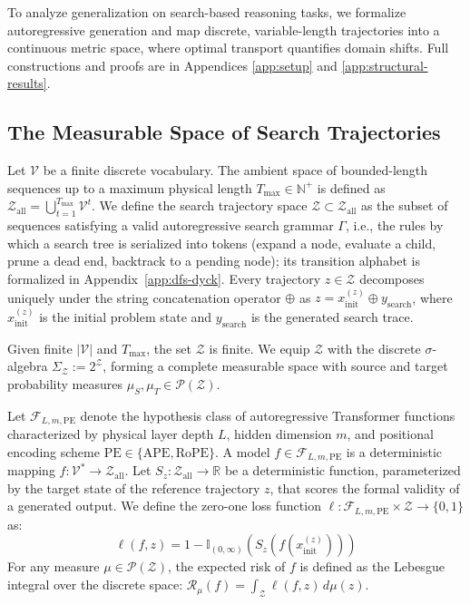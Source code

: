 \documentclass{article}
\begin{document}
To analyze generalization on search-based reasoning tasks, we formalize autoregressive generation and map discrete, variable-length trajectories into a continuous metric space, where optimal transport quantifies domain shifts. Full constructions and proofs are in Appendices \ref{app:setup} and \ref{app:structural-results}.
 
\subsection{The Measurable Space of Search Trajectories}

Let $\mathcal{V}$ be a finite discrete vocabulary. The ambient space of bounded-length sequences up to a maximum physical length $T_{\max} \in \mathbb{N}^+$ is defined as $\mathcal{Z}_{\mathrm{all}} = \bigcup_{t=1}^{T_{\max}} \mathcal{V}^t$. We define the search trajectory space $\mathcal{Z} \subset \mathcal{Z}_{\mathrm{all}}$ as the subset of sequences satisfying a valid autoregressive search grammar $\Gamma$, i.e., the rules by which a search tree is serialized into tokens (expand a node, evaluate a child, prune a dead end, backtrack to a pending node); its transition alphabet is formalized in Appendix~\ref{app:dfs-dyck}. %
 Every trajectory $z \in \mathcal{Z}$ decomposes uniquely under the string concatenation operator $\oplus$ as $z = x_{\mathrm{init}}^{(z)} \oplus y_{\mathrm{search}}$, where $x_{\mathrm{init}}^{(z)}$ is the initial problem state and $y_{\mathrm{search}}$ is the generated search trace.

Given finite $|\mathcal{V}|$ and $T_{\max}$, the set $\mathcal{Z}$ is finite. We equip $\mathcal{Z}$ with the discrete $\sigma$-algebra $\Sigma_{\mathcal{Z}} := 2^{\mathcal{Z}}$, forming a complete measurable space with source and target probability measures $\mu_S, \mu_T \in \mathcal{P}(\mathcal{Z})$.

Let $\mathcal{F}_{L, m, \mathrm{PE}}$ denote the hypothesis class of autoregressive Transformer functions characterized by physical layer depth $L$, hidden dimension $m$, and positional encoding scheme $\mathrm{PE} \in \{\text{APE}, \text{RoPE}\}$. A model $f \in \mathcal{F}_{L, m, \mathrm{PE}}$ is a deterministic mapping $f: \mathcal{V}^* \to \mathcal{Z}_{\mathrm{all}}$. Let $S_z: \mathcal{Z}_{\mathrm{all}} \to \mathbb{R}$ be a deterministic function, parameterized by the target state of the reference trajectory $z$, that scores the formal validity of a generated output. We define the zero-one loss function $\ell: \mathcal{F}_{L, m, \mathrm{PE}} \times \mathcal{Z} \to \{0, 1\}$ as:
\begin{equation}
    \ell(f, z) = 1 - \mathbb{I}_{(0, \infty)}\left(S_z\left(f(x_{\mathrm{init}}^{(z)})\right)\right)
\end{equation}
For any measure $\mu \in \mathcal{P}(\mathcal{Z})$, the expected risk of $f$ is defined as the Lebesgue integral over the discrete space: $\mathcal{R}_{\mu}(f) = \int_{\mathcal{Z}} \ell(f, z) \, d\mu(z)$.
\end{document}
